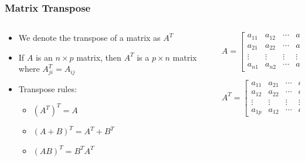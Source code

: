 \documentclass{beamer}
\begin{document}
\begin{frame}
  \frametitle{Matrix Transpose}

\begin{columns}
\begin{column}{5.5cm}

\begin{itemize}
	\item We denote the transpose of a matrix as $A^T$
	
\medskip	

  \item If $A$ is an $n \times p$ matrix, then $A^T$ is a $p \times n$ matrix where $A^T_{ji} = A_{ij}$

  \item Transpose rules:
  \begin{itemize}
  \item $(A^T)^T = A$
  \item $(A + B)^T = A^T + B^T$
  \item $(AB)^T = B^T A^T$
  \end{itemize}

\end{itemize}

\end{column}

\begin{column}{5cm}

\[
A = \left[ \begin{array}{cccc}

a_{11} & a_{12} & \cdots & a_{1p} \\
a_{21} & a_{22} & \cdots & a_{2p} \\
\vdots & \vdots & \vdots & \vdots \\
a_{n1} & a_{n2} & \cdots & a_{np}
\end{array}
\right]
\]

\[
A^T = \left[ \begin{array}{cccc}

a_{11} & a_{21} & \cdots & a_{n1} \\
a_{12} & a_{22} & \cdots & a_{n2} \\
\vdots & \vdots & \vdots & \vdots \\
a_{1p} & a_{12} & \cdots & a_{np}
\end{array}
\right]
\]

\end{column}
\end{columns}



\end{frame}
\end{document}
